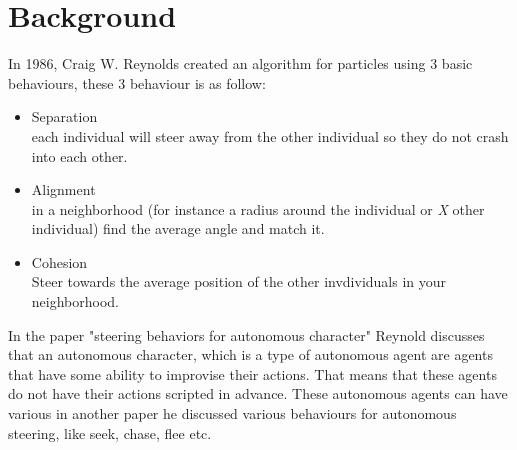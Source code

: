 \section{Background}
In 1986, Craig W. Reynolds created an algorithm for particles using 3 basic behaviours, these 3 behaviour is as follow:
\begin{itemize}
    \item Separation \\
        each individual will steer away from the other individual so they do not crash into each other.
    \item Alignment \\
        in a neighborhood (for instance a radius around the individual or \textit{X} other individual) find the average angle and match it.
    \item Cohesion \\
        Steer towards the average position of the other invdividuals in your neighborhood.
\end{itemize}


In the paper "steering behaviors for autonomous character" Reynold discusses that an autonomous character, which is a type of autonomous agent are agents that have some ability to improvise their actions. That means that these agents do not have their actions scripted in advance.
These autonomous agents can have various 
in another paper he discussed various behaviours for autonomous steering, like seek, chase, flee etc.




